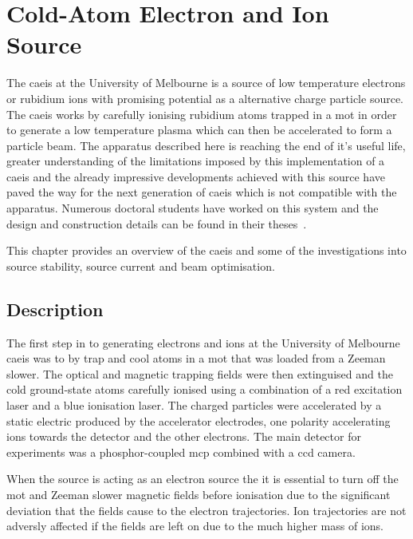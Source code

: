 \chapter{Cold-Atom Electron and Ion Source}\label{chapter:setup}

The \gls{caeis} at the University of Melbourne is a source of low temperature electrons or rubidium ions with promising potential as a alternative charge particle source.
The \gls{caeis} works by carefully ionising rubidium atoms trapped in a \gls{mot} in order to generate a low temperature plasma which can then be accelerated to form a particle beam.
The apparatus described here is reaching the end of it's useful life, greater understanding of the limitations imposed by this implementation of a \gls{caeis} and the already impressive developments achieved with this source have paved the way for the next generation of \gls{caeis} which is not compatible with the apparatus.
Numerous doctoral students have worked on this system and the design and construction details can be found in their theses~\cite{sheludko_shaped_2010,bell_cold_2011,saliba_cold_2011,mcculloch_generation_2013,murphy_measurement_2017,speirs_electron_2017}.

This chapter provides an overview of the \gls{caeis} and some of the investigations into source stability, source current and beam optimisation.

\section{Description}
The first step in to generating electrons and ions at the University of Melbourne \gls{caeis} was to by trap and cool atoms in a \gls{mot} that was loaded from a Zeeman slower.
The optical and magnetic trapping fields were then extinguised and the cold ground-state atoms carefully ionised using a combination of a red excitation laser and a blue ionisation laser.
The charged particles were accelerated by a static electric produced by the accelerator electrodes, one polarity accelerating ions towards the detector and the other electrons.
The main detector for experiments was a phosphor-coupled \gls{mcp} combined with a \gls{ccd} camera.

When the source is acting as an electron source the it is essential to turn off the \gls{mot} and Zeeman slower magnetic fields before ionisation due to the significant deviation that the fields cause to the electron trajectories.
Ion trajectories are not adversly affected if the fields are left on due to the much higher mass of ions.

